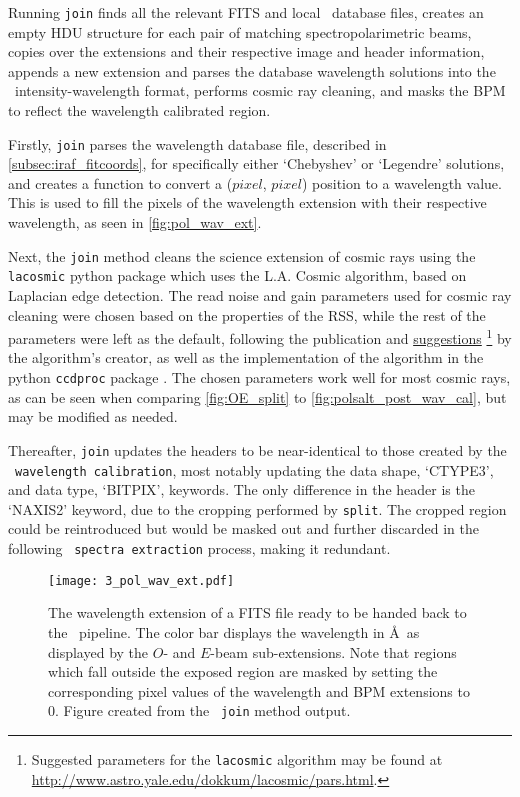 Running \texttt{join} finds all the relevant \gls{FITS} and local \iraf\ database files, creates an empty \gls{HDU} structure for each pair of matching spectropolarimetric beams, copies over the extensions and their respective image and header information, appends a new extension and parses the database wavelength solutions into the \polsalt\ intensity-wavelength format, performs cosmic ray cleaning, and masks the \gls{BPM} to reflect the wavelength calibrated region.

Firstly, \texttt{join} parses the wavelength database file, described in \autoref{subsec:iraf_fitcoords}, for specifically either `Chebyshev' or `Legendre' solutions, and creates a function to convert a ($pixel$, $pixel$) position to a wavelength value. This is used to fill the pixels of the wavelength extension with their respective wavelength, as seen in \autoref{fig:pol_wav_ext}.

Next, the \texttt{join} method cleans the science extension of cosmic rays using the \texttt{lacosmic} python package which uses the L.A. Cosmic algorithm, based on Laplacian edge detection. The read noise and gain parameters used for cosmic ray cleaning were chosen based on the properties of the \gls{RSS}, while the rest of the parameters were left as the default, following the publication and \href{http://www.astro.yale.edu/dokkum/lacosmic/pars.html}{suggestions}%
\footnote{Suggested parameters for the \texttt{lacosmic} algorithm may be found at \url{http://www.astro.yale.edu/dokkum/lacosmic/pars.html}.}
by the algorithm's creator, as well as the implementation of the algorithm in the python \texttt{ccdproc} package \citep{lacosmic,astroscrappy}. The chosen parameters work well for most cosmic rays, as can be seen when comparing \autoref{fig:OE_split} to \autoref{fig:polsalt_post_wav_cal}, but may be modified as needed.

Thereafter, \texttt{join} updates the headers to be near-identical to those created by the \polsalt\ \texttt{wavelength calibration}, most notably updating the data shape, `CTYPE3', and data type, `BITPIX', keywords.
The only difference in the header is the  `NAXIS2' keyword, due to the cropping performed by \texttt{split}. The cropped region could be reintroduced but would be masked out and further discarded in the following \polsalt\ \texttt{spectra extraction} process, making it redundant.

\begin{figure}[t]
    \centering
    \texttt{[image: 3\_pol\_wav\_ext.pdf]}
    \caption{The wavelength extension of a \gls{FITS} file ready to be handed back to the \polsalt\ pipeline. The color bar displays the wavelength in \AA\ as displayed by the $O$- and $E$-beam sub-extensions. Note that regions which fall outside the exposed region are masked by setting the corresponding pixel values of the wavelength and \gls{BPM} extensions to $0$. Figure created from the \stops\ \texttt{join} method output.}
    \label{fig:pol_wav_ext}
\end{figure}

